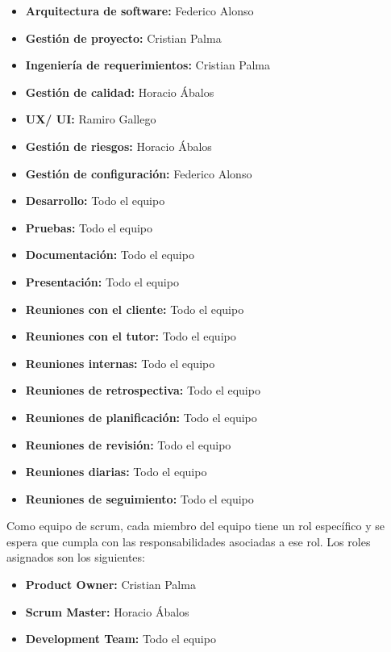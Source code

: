 \begin{itemize}
    \item \textbf{Arquitectura de software:} Federico Alonso
    \item \textbf{Gestión de proyecto:} Cristian Palma
    \item \textbf{Ingeniería de requerimientos:} Cristian Palma
    \item \textbf{Gestión de calidad:} Horacio Ábalos
    \item \textbf{UX/ UI:} Ramiro Gallego
    \item \textbf{Gestión de riesgos:} Horacio Ábalos
    \item \textbf{Gestión de configuración:} Federico Alonso
    \item \textbf{Desarrollo:} Todo el equipo
    \item \textbf{Pruebas:} Todo el equipo
    \item \textbf{Documentación:} Todo el equipo
    \item \textbf{Presentación:} Todo el equipo
    \item \textbf{Reuniones con el cliente:} Todo el equipo
    \item \textbf{Reuniones con el tutor:} Todo el equipo
    \item \textbf{Reuniones internas:} Todo el equipo
    \item \textbf{Reuniones de retrospectiva:} Todo el equipo
    \item \textbf{Reuniones de planificación:} Todo el equipo
    \item \textbf{Reuniones de revisión:} Todo el equipo
    \item \textbf{Reuniones diarias:} Todo el equipo
    \item \textbf{Reuniones de seguimiento:} Todo el equipo
\end{itemize}

Como equipo de scrum, cada miembro del equipo tiene un rol específico y se espera que cumpla con las responsabilidades asociadas a ese rol. Los roles asignados son los siguientes:

\begin{itemize}
    \item \textbf{Product Owner:} Cristian Palma
    \item \textbf{Scrum Master:} Horacio Ábalos
    \item \textbf{Development Team:} Todo el equipo
\end{itemize}